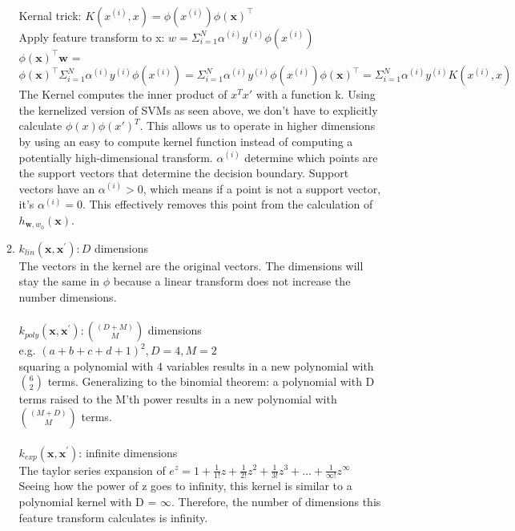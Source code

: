 \documentclass[12pt]{article}
\begin{document}
\begin{enumerate}[noitemsep,topsep=1pt]
\begin{enumerate}
    \\ Kernal trick: $K(x^{(i)},x) = \phi(x^{(i)})\phi(\mathbf{x})^\top$
    \\ Apply feature transform to x: $w = \Sigma_{i=1}^N \alpha^{(i)} y^{(i)} \phi(x^{(i)})$
    \\ $\phi(\mathbf{x})^\top \mathbf{w}$ = $\phi(\mathbf{x})^\top \Sigma_{i=1}^N \alpha^{(i)} y^{(i)} \phi(x^{(i)}) 
    = \Sigma_{i=1}^N \alpha^{(i)} y^{(i)} \phi(x^{(i)})\phi(\mathbf{x})^\top 
    = \Sigma_{i=1}^N \alpha^{(i)} y^{(i)} K(x^{(i)},x)$
    \\ The Kernel computes the inner product of $x^T x'$ with a function k. 
    Using the kernelized version of SVMs as seen above, we don't have to explicitly calculate $\phi(x) \phi(x')^T$.
    This allows us to operate in higher dimensions by using an easy to compute kernel function 
    instead of computing a potentially high-dimensional transform. $\alpha^{(i)}$ determine which points 
    are the support vectors that determine the decision boundary. Support vectors have an $\alpha^{(i)} > 0$,
    which means if a point is not a support vector, it's $\alpha^{(i)} = 0$. This effectively removes
    this point from the calculation of $h_{\mathbf{w},w_0}(\mathbf{x})$. 

    \item
    $k_{lin}(\mathbf{x},\mathbf{x}^\prime): D$ dimensions 
    \\ The vectors in the kernel are the original vectors. The dimensions will stay the same in $\phi$ 
    because a linear transform does not increase the number dimensions. \\
    \\$k_{poly}(\mathbf{x},\mathbf{x}^\prime): {(D+M) \choose M}$ dimensions
    \\ e.g. $(a+b+c+d+1)^2, D=4, M=2$
    \\ squaring a polynomial with 4 variables results in a new polynomial with ${6 \choose 2}$ terms.
    Generalizing to the binomial theorem: a polynomial with D terms raised to the M'th power results in a new polynomial with ${(M+D) \choose M}$ terms. \\
    \\$k_{exp}(\mathbf{x},\mathbf{x}^\prime)$: infinite dimensions
    \\ The taylor series expansion of $e^z = 1 + \frac{1}{1!}z + \frac{1}{2!}z^2 + \frac{1}{3!}z^3 + ... + \frac{1}{\infty !}z^{\infty}$
    \\ Seeing how the power of z goes to infinity, this kernel is similar to a polynomial kernel with D = $\infty$.
    Therefore, the number of dimensions this feature transform calculates is infinity. 


\end{enumerate}
\end{enumerate}
\end{document}
